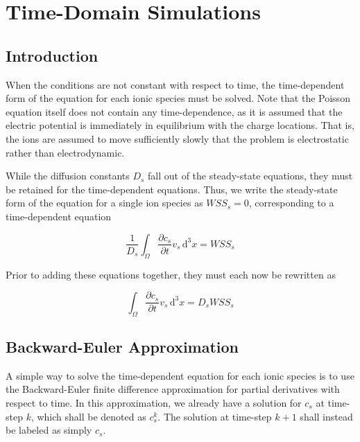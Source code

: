 
\section{Time-Domain Simulations}\label{sec:timedomain}

\subsection{Introduction}\label{subsec:timedomain_intro}

When the conditions are not constant with respect to time,
the time-dependent form of the equation for each ionic species must be solved.
Note that the Poisson equation itself does not contain any time-dependence,
as it is assumed that the electric potential is immediately in equilibrium with the charge locations.
That is, the ions are assumed to move sufficiently slowly that the problem
is electrostatic rather than electrodynamic.

While the diffusion constants $D_s$ fall out of the steady-state equations,
they must be retained for the time-dependent equations.
Thus, we write the steady-state form of the equation for a single ion species as
$WSS_s = 0$,
corresponding to a time-dependent equation

\begin{equation}
  \frac{1}{D_s} \int_\Omega \frac{\partial c_s}{\partial t} v_s \,\mathrm{d}^3x
  = WSS_s
\end{equation}

Prior to adding these equations together, they must each now be rewritten as

\begin{equation}
  \int_\Omega \frac{\partial c_s}{\partial t} v_s \,\mathrm{d}^3x
  = D_s WSS_s
\end{equation}


\subsection{Backward-Euler Approximation}\label{subsec:backward_euler}

A simple way to solve the time-dependent equation for each ionic species is to use the Backward-Euler
finite difference approximation for partial derivatives with respect to time.
In this approximation, we already have a solution for $c_s$ at time-step $k$,
which shall be denoted as $c_s^k$.
The solution at time-step $k+1$ shall instead be labeled as simply $c_s$.

